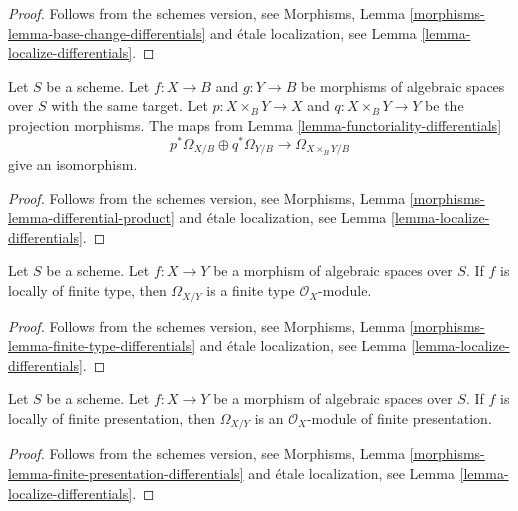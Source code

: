 \begin{proof}
Follows from the schemes version, see
Morphisms, Lemma \ref{morphisms-lemma-base-change-differentials}
and \'etale localization, see
Lemma \ref{lemma-localize-differentials}.
\end{proof}

\begin{lemma}
\label{lemma-differential-product}
Let $S$ be a scheme.
Let $f : X \to B$ and $g : Y \to B$ be morphisms of algebraic spaces
over $S$ with the same target.
Let $p : X \times_B Y \to X$ and $q : X \times_B Y \to Y$ be the
projection morphisms. The maps from
Lemma \ref{lemma-functoriality-differentials}
$$
p^*\Omega_{X/B} \oplus q^*\Omega_{Y/B}
\longrightarrow
\Omega_{X \times_B Y/B}
$$
give an isomorphism.
\end{lemma}

\begin{proof}
Follows from the schemes version, see
Morphisms, Lemma \ref{morphisms-lemma-differential-product}
and \'etale localization, see
Lemma \ref{lemma-localize-differentials}.
\end{proof}

\begin{lemma}
\label{lemma-finite-type-differentials}
Let $S$ be a scheme.
Let $f : X \to Y$ be a morphism of algebraic spaces over $S$.
If $f$ is locally of finite type, then $\Omega_{X/Y}$ is
a finite type $\mathcal{O}_X$-module.
\end{lemma}

\begin{proof}
Follows from the schemes version, see
Morphisms, Lemma \ref{morphisms-lemma-finite-type-differentials}
and \'etale localization, see
Lemma \ref{lemma-localize-differentials}.
\end{proof}

\begin{lemma}
\label{lemma-finite-presentation-differentials}
Let $S$ be a scheme.
Let $f : X \to Y$ be a morphism of algebraic spaces over $S$.
If $f$ is locally of finite presentation, then $\Omega_{X/Y}$ is
an $\mathcal{O}_X$-module of finite presentation.
\end{lemma}

\begin{proof}
Follows from the schemes version, see
Morphisms, Lemma \ref{morphisms-lemma-finite-presentation-differentials}
and \'etale localization, see
Lemma \ref{lemma-localize-differentials}.
\end{proof}

